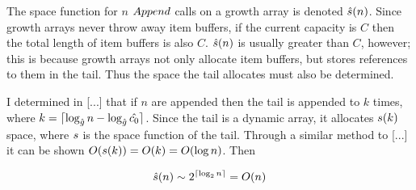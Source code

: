 \HdrSpaceComplex

The space function for $n$ $Append$ calls on a growth array is denoted $\hat{s}(n)$. Since growth arrays never throw away item buffers, if the current capacity is $C$ then the total length of item buffers is also $C$. $\hat{s}(n)$ is usually greater than $C$, however; this is because growth arrays not only allocate item buffers, but stores references to them in the tail. Thus the space the tail allocates must also be determined.

I determined in [...] that if $n$ are appended then the tail is appended to $k$ times, where $k = \lceil \log_{\hat{g}} n - \log_{\hat{g}} \hat{c_0} \rceil$. Since the tail is a dynamic array, it allocates $s(k)$ space, where $s$ is the space function of the tail. Through a similar method to [...] it can be shown $O(s(k)) = O(k) = O(\log n)$. Then %

\begin{align*}
\hat{s}(n) \sim 2^{\lceil \log_2 n \rceil} = O(n)
\end{align*}